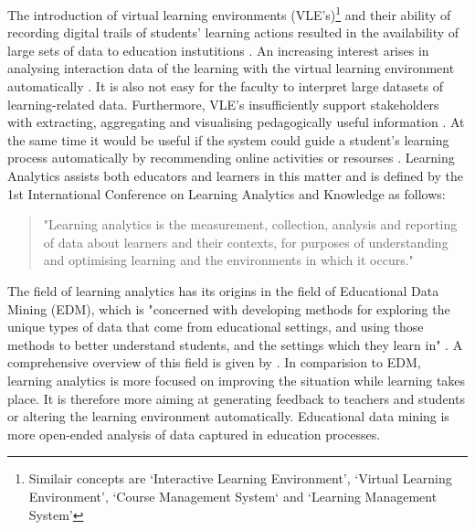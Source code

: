 \documentclass[11pt]{article}
\begin{document}
The introduction of virtual learning environments (VLE's)\footnote{Similair concepts are `Interactive Learning Environment', `Virtual Learning Environment', `Course Management System` and `Learning Management System'} and their ability of recording digital trails of students' learning actions resulted in the availability of large sets of data to education instutitions \cite{Ferguson2012a}\cite{Romero2007}. An increasing interest arises in analysing interaction data of the learning with the virtual learning environment automatically \cite{Muehlenbrock2005}. It is also not easy for the faculty to interpret large datasets of learning-related data. Furthermore, VLE's insufficiently support stakeholders with extracting, aggregating and visualising pedagogically useful information \cite{Zhang2007}\cite{Dawson2010}\cite{Zaiane2001}. At the same time it would be useful if the system could guide a student's learning process automatically by recommending online activities or resourses \cite{Zaiane2001}.
Learning Analytics assists both educators and learners in this matter and is defined by the 1st International Conference on Learning Analytics and Knowledge as follows:
\begin{quote}
"Learning analytics is the measurement, collection, analysis and reporting of data about learners and their contexts, for purposes of understanding and optimising learning and the environments in which it occurs." \cite{lak2011}
\end{quote}

The field of learning analytics has its origins in the field of Educational Data Mining (EDM), which is "concerned with developing methods for exploring the unique types of data that come from educational settings, and using those methods to better understand students, and the settings which they learn in" \cite{Baker2009}. A comprehensive overview of this field is given by \cite{Romero2007}. In comparision to EDM, learning analytics is more focused on improving the situation while learning takes place. It is therefore more aiming at generating feedback to teachers and students or altering the learning environment automatically. Educational data mining is more open-ended analysis of data captured in education processes. 
\end{document}
